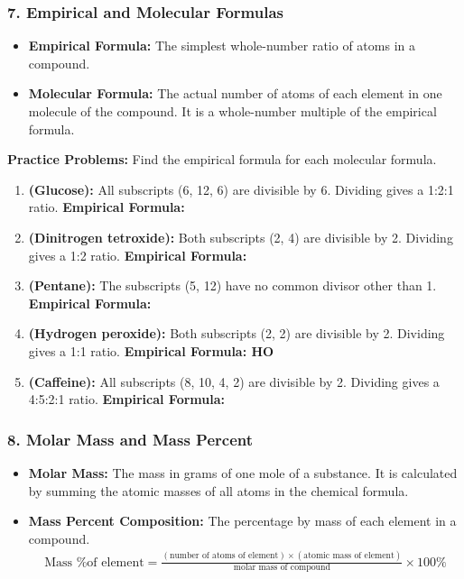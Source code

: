 \documentclass{article}
\begin{document}
\bigskip
\subsubsection*{7. Empirical and Molecular Formulas}
\begin{itemize}[itemsep=5pt]
    \item \textbf{Empirical Formula:} The simplest whole-number ratio of atoms in a compound.
    \item \textbf{Molecular Formula:} The actual number of atoms of each element in one molecule of the compound. It is a whole-number multiple of the empirical formula.
\end{itemize}

\textbf{Practice Problems:} Find the empirical formula for each molecular formula.
\begin{enumerate}[itemsep=5pt]
    \item \textbf{ (Glucose):} All subscripts (6, 12, 6) are divisible by 6. Dividing gives a 1:2:1 ratio. \textbf{Empirical Formula: }
    \item \textbf{ (Dinitrogen tetroxide):} Both subscripts (2, 4) are divisible by 2. Dividing gives a 1:2 ratio. \textbf{Empirical Formula: }
    \item \textbf{ (Pentane):} The subscripts (5, 12) have no common divisor other than 1. \textbf{Empirical Formula: }
    \item \textbf{ (Hydrogen peroxide):} Both subscripts (2, 2) are divisible by 2. Dividing gives a 1:1 ratio. \textbf{Empirical Formula: HO}
    \item \textbf{ (Caffeine):} All subscripts (8, 10, 4, 2) are divisible by 2. Dividing gives a 4:5:2:1 ratio. \textbf{Empirical Formula: }
\end{enumerate}

\bigskip
\subsubsection*{8. Molar Mass and Mass Percent}
\begin{itemize}[itemsep=5pt]
    \item \textbf{Molar Mass:} The mass in grams of one mole of a substance. It is calculated by summing the atomic masses of all atoms in the chemical formula.
    \item \textbf{Mass Percent Composition:} The percentage by mass of each element in a compound.
    \begin{align*}
        \text{Mass \% of element} = \frac{(\text{number of atoms of element}) \times (\text{atomic mass of element})}{\text{molar mass of compound}} \times 100\%
    \end{align*}
\end{itemize}
\end{document}
